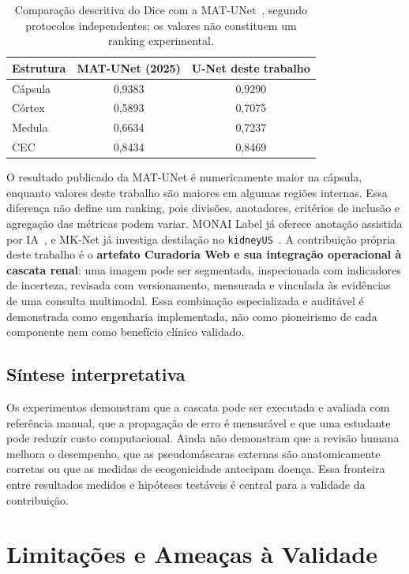 \documentclass[12pt]{article}
\begin{document}
\begin{table}[!htbp]
\centering
\caption[Comparação descritiva com MAT-UNet]{Comparação descritiva do Dice com a MAT-UNet~\cite{Zuo2025RenalAttention}, segundo protocolos independentes; os valores não constituem um ranking experimental.}
\label{tab:comparacao_literatura}
\begin{tabular}{lcc}
\toprule
\textbf{Estrutura} & \textbf{MAT-UNet (2025)} & \textbf{U-Net deste trabalho} \\
\midrule
Cápsula & 0,9383 & 0,9290 \\
Córtex & 0,5893 & 0,7075 \\
Medula & 0,6634 & 0,7237 \\
CEC & 0,8434 & 0,8469 \\
\bottomrule
\end{tabular}
\end{table}

O resultado publicado da MAT-UNet é numericamente maior na cápsula, enquanto valores deste trabalho são maiores em algumas regiões internas. Essa diferença não define um ranking, pois divisões, anotadores, critérios de inclusão e agregação das métricas podem variar. MONAI Label já oferece anotação assistida por IA~\cite{DiazPinto2024MONAILabel}, e MK-Net já investiga destilação no \texttt{kidneyUS}~\cite{Chen2026MKNet}. A contribuição própria deste trabalho é o \textbf{artefato Curadoria Web e sua integração operacional à cascata renal}: uma imagem pode ser segmentada, inspecionada com indicadores de incerteza, revisada com versionamento, mensurada e vinculada às evidências de uma consulta multimodal. Essa combinação especializada e auditável é demonstrada como engenharia implementada, não como pioneirismo de cada componente nem como benefício clínico validado.

\subsection{Síntese interpretativa}
Os experimentos demonstram que a cascata pode ser executada e avaliada com referência manual, que a propagação de erro é mensurável e que uma estudante pode reduzir custo computacional. Ainda não demonstram que a revisão humana melhora o desempenho, que as pseudomáscaras externas são anatomicamente corretas ou que as medidas de ecogenicidade antecipam doença. Essa fronteira entre resultados medidos e hipóteses testáveis é central para a validade da contribuição.

\section{Limitações e Ameaças à Validade}
\end{document}

